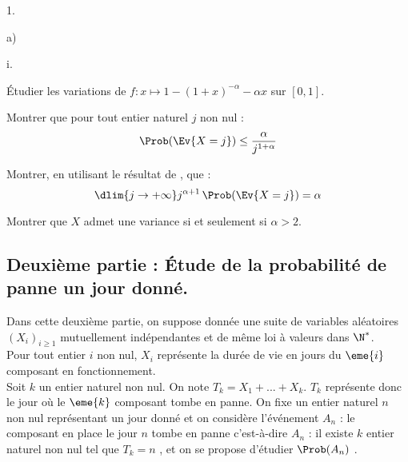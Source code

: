 \documentclass[11pt]{article}%
\begin{document}
\begin{noliste}{1.}
\begin{noliste}{a)}
  \item
    \begin{nonoliste}{i.}
    \item Étudier les variations de $f : x \mapsto 1-(1+x)^{-\alpha}-\alpha 
      x$ sur $[0,1]$. 

      
      
    \item Montrer que pour tout entier naturel $j$ non nul :
      \[
      \Prob(\Ev{X=j}) \leq \frac{\alpha}{j^{1+\alpha}}
      \]

      

    \end{nonoliste}



    
  \item Montrer, en utilisant le résultat de , que :
    \[
    \dlim{j \to +\infty} j^{\alpha+1} \, \Prob(\Ev{X=j}) = \alpha
    \]

    

    


  \item Montrer que $X$ admet une variance si et seulement si $\alpha 
    >2$. 

    

  \end{noliste}
\end{noliste}

\subsection*{Deuxième partie : Étude de la probabilité de 
panne un jour donné.}
\noindent
Dans cette deuxième partie, on suppose donnée une suite de variables
aléatoires $(X_i)_{i \geq 1}$ mutuellement indépendantes et de même
loi à valeurs dans $\N^*$.\\
Pour tout entier $i$ non nul, $X_i$ représente la durée de vie en
jours du $\eme{i}$ composant en fonctionnement.\\
Soit $k$ un entier naturel non nul. On note $T_k= X_1+...+X_k$. $T_k$
représente donc le jour où le $\eme{k}$ composant tombe en panne. On
fixe un entier naturel $n$ non nul représentant un jour donné et on
considère l'événement $A_n$ : \og le composant en place le jour $n$
tombe en panne \fg{} c'est-à-dire $A_n$ : \og il existe $k$ entier
naturel non nul tel que $T_k=n$ \fg{}, et on se propose d'étudier
$\Prob(A_n)$ .
\end{document}
